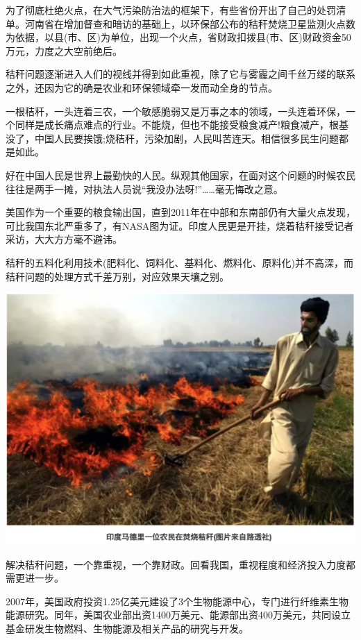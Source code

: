 \documentclass[]{book}
\begin{document}
为了彻底杜绝火点，在大气污染防治法的框架下，有些省份开出了自己的处罚清单。河南省在增加督查和暗访的基础上，以环保部公布的秸秆焚烧卫星监测火点数为依据，以县(市、区)为单位，出现一个火点，省财政扣拨县(市、区)财政资金50万元，力度之大空前绝后。

秸秆问题逐渐进入人们的视线并得到如此重视，除了它与雾霾之间千丝万缕的联系之外，还因为它的确是农业和环保领域牵一发而动全身的节点。

一根秸秆，一头连着三农，一个敏感脆弱又是万事之本的领域，一头连着环保，一个同样是成长痛点难点的行业。不能烧，但也不能接受粮食减产!粮食减产，根基没了，中国人民要挨饿;烧秸秆，污染加剧，人民叫苦连天。相信很多民生问题都是如此。

好在中国人民是世界上最勤快的人民。纵观其他国家，在面对这个问题的时候农民往往是两手一摊，对执法人员说``我没办法呀!''\ldots{}\ldots{}毫无悔改之意。

美国作为一个重要的粮食输出国，直到2011年在中部和东南部仍有大量火点发现，可比我国东北严重多了，有NASA图为证。印度人民更是开挂，烧着秸秆接受记者采访，大大方方毫不避讳。

秸秆的五料化利用技术(肥料化、饲料化、基料化、燃料化、原料化)并不高深，而秸秆问题的处理方式千差万别，对应效果天壤之别。

\includegraphics[width=8.33in]{images/stalk4}

解决秸秆问题，一个靠重视，一个靠财政。回看我国，重视程度和经济投入力度都需更进一步。

2007年，美国政府投资1.25亿美元建设了3个生物能源中心，专门进行纤维素生物能源研究。同年，美国农业部出资1400万美元、能源部出资400万美元，共同设立基金研发生物燃料、生物能源及相关产品的研究与开发。
\end{document}
